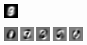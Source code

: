 \documentclass[notitlepage]{revtex4-1}
\begin{document}
\begin{figure}
\begin{subfigure}{.15\linewidth}
    \caption{}
    \label{fig:vbias}
  \end{subfigure}
  \begin{subfigure}{.15\linewidth}
    \includegraphics[width=\linewidth]{X_l_eigv_1.png}
    \caption{}
    \label{fig:m1data}
  \end{subfigure}\par\medskip
  \begin{subfigure}{\linewidth}
    \includegraphics[width=.05\linewidth]{X_l_eigv_2.png}
    \includegraphics[width=.05\linewidth]{X_l_eigv_3.png}
    \includegraphics[width=.05\linewidth]{X_l_eigv_4.png}
    \includegraphics[width=.05\linewidth]{X_l_eigv_5.png}
    \includegraphics[width=.05\linewidth]{X_l_eigv_6.png}

\end{subfigure}
\end{figure}
\end{document}
